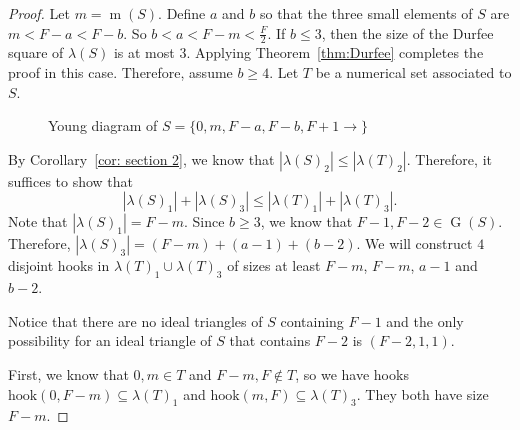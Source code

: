 \documentclass{amsproc}
\DeclareMathOperator{\G}{G}
\DeclareMathOperator{\m}{m}
\newcommand{\hook}{\text{hook}}
\theoremstyle{definition}
\theoremstyle{remark}
\numberwithin{equation}{section}
\begin{document}
\begin{proof}
Let $m = \m(S)$.  Define $a$ and $b$ so that the three small elements of $S$ are $m <F-a<F-b$. So $b<a<F-m<\frac{F}{2}$.
If $b\leq 3$, then the size of the Durfee square of $\lambda(S)$ is at most $3$.  Applying Theorem~\ref{thm:Durfee} completes the proof in this case. Therefore, assume $b\geq 4$. 
Let $T$ be a numerical set associated to $S$.
\begin{figure}[H]
\caption{Young diagram of $S=\{0,m,F-a,F-b,F+1\rightarrow\}$}
\end{figure}

By Corollary~\ref{cor: section 2}, we know that 
$|\lambda(S)_2|\leq |\lambda(T)_2|$.
Therefore, it suffices to show that 
    \[
|\lambda(S)_1|+|\lambda(S)_3|\leq|\lambda(T)_1|+|\lambda(T)_3|.
\]
Note that $|\lambda(S)_1|=F-m$. Since $b\geq 3$, we know that $F-1,F-2\in \G(S)$. Therefore, $|\lambda(S)_3|=(F-m)+(a-1)+(b-2)$.
We will construct $4$ disjoint hooks in $\lambda(T)_1\cup \lambda(T)_3$ of sizes at least $F-m$, $F-m$, $a-1$ and $b-2$.

Notice that there are no ideal triangles of $S$ containing $F-1$ and the only possibility for an ideal triangle of $S$ that contains $F-2$ is $(F-2,1,1)$.

First, we know that $0,m\in T$ and $F-m,F\notin T$, so we have hooks $\hook(0,F-m)\subseteq \lambda(T)_1$ and $\hook(m,F)\subseteq \lambda(T)_3$. They both have size $F-m$.


\end{proof}
\end{document}
